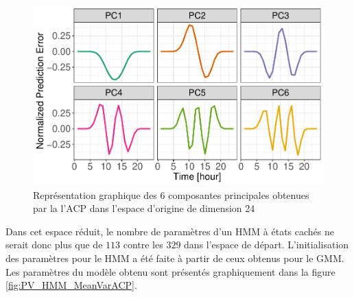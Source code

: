 \documentclass[12pt]{report}
\begin{document}
\begin{figure}[h]
	\centering
	\includegraphics[width = 0.8 \linewidth]{Images/PV/ACP/ACP_PrincipalComp_6.pdf}
	\caption{Représentation graphique des 6 composantes principales obtenues par la l'ACP dans l'espace d'origine de dimension 24}
	\label{fig:PV_HMM_ACP_PC}
\end{figure}

Dans cet espace réduit, le nombre de paramètres d'un HMM à états cachés ne serait donc plus que de $113$ contre les $329$ dans l'espace de départ. L'initialisation des paramètres pour le HMM a été faite à partir de ceux obtenus pour le GMM. Les paramètres du modèle obtenu sont présentés graphiquement dans la figure \ref{fig:PV_HMM_MeanVarACP}.
\end{document}
